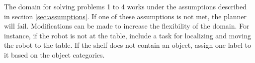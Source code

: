 \documentclass[paper=a4, fontsize=11pt]{scrartcl}
\begin{document}
\vspace{5mm}

The domain for solving problems 1 to 4 works under the assumptions described in section \ref{sec:assumptions}. If one of these assumptions is not met, the planner will fail. Modifications can be made to increase the flexibility of the domain. For instance, if the robot is not at the table, include a task for localizing and moving the robot to the table. If the shelf does not contain an object, assign one label to it based on the object categories. 

	{}
	
	
	
\end{document}
